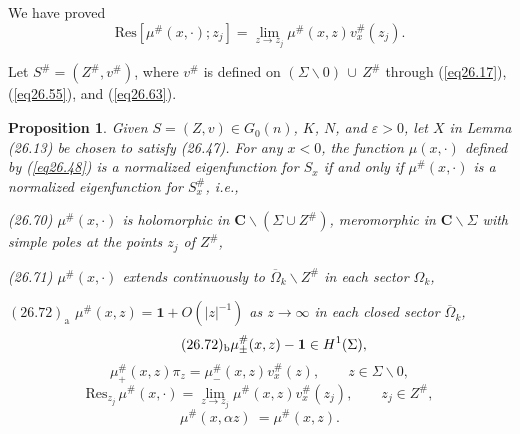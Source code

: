 \documentclass{surv-l}
\theoremstyle{plain}
\newtheorem{prop}[theorem]{Proposition}
\theoremstyle{definition}
\numberwithin{equation}{chapter}
\begin{document}
We have proved
\begin{equation}\label{eq26.68}
\mathrm{Res}[\mu^{\#}(x, \cdot);z_{j}]=\lim_{z\rightarrow z_{j}}\mu^{\#}(x, z)v_{x}^{\#}(z_{j}).
\end{equation}

Let $S^\#=(Z^{\#}, v^{\#})$, where $v^{\#}$ is defined on $(\Sigma\backslash 0)\,\cup\, Z^\#$ through (\ref{eq26.17}), (\ref{eq26.55}), and (\ref{eq26.63}).
\renewcommand\thetheorem{26.\arabic{theorem}}
\setcounter{theorem}{68}
\begin{prop}\label{prop26.69}
Given $S=(Z, v)\in G_{0}(n)$, $K$, $N$,  and  $\varepsilon >0$, let
$X$ in Lemma \emph{(26.13)} be chosen to satisfy \emph{(26.47)}. For any $x<0$, the function $\mu(x, \cdot)$ defined by \emph{(\ref{eq26.48})} is a normalized eigenfunction for $S_{x}$ if and only if $\mu^{\#}(x, \cdot)$ is a normalized eigenfunction for $ S_{x}^{\#}$, i.e.,

\emph{(26.70)} $\mu^{\#}(x, \cdot)$ is holomorphic in $\mathbf{C}\backslash (\Sigma\cup Z^{\#})$, meromorphic in $\mathbf{C}\backslash \Sigma$ with simple poles at the points $z_{j}$ of $Z^{\#}$,

\emph{(26.71)} $\mu^{\#}(x, \cdot)$ extends continuously to $\overline{\Omega}_{k}\backslash Z^\#$ in each sector $\Omega_{k}$,

\emph{$(26.72)_{\mathrm{a}}$} $\mu^{\#}(x,z) =\mathbf{1}+O(|z|^{-1})$ as $z\rightarrow\infty$ in each closed sector $\overline{\Omega}_{k}$,
\begin{equation*}
\tag*{$(26.72)_{\mathrm{b}}$}\mu_{\pm}^{\#}(x, z)-\mathbf{1} \in H^{1}(\Sigma),
\end{equation*}
\setcounter{equation}{72}
\begin{equation}\label{eq26.73}
\mu_{+}^{\#}(x, z)\pi_{z}=\mu_{-}^{\#}(x, z)v_{x}^{\#}(z),\qquad z\in\Sigma\backslash 0,
\end{equation}
\begin{equation}\label{eq26.74}
\mathrm{Res}_{z_{j}}\,\mu^{\#}(x, \cdot)=\lim_{z\rightarrow z_{j}}\mu^{\#}(x, z)v_{x}^{\#}(z_{j}),\qquad z_{j}\in Z^{\#},
\end{equation}
\begin{equation}\label{eq26.75}
\mu^{\#}(x, \alpha z)\ =\mu^{\#}(x,z).
\end{equation}
\end{prop}
\end{document}
